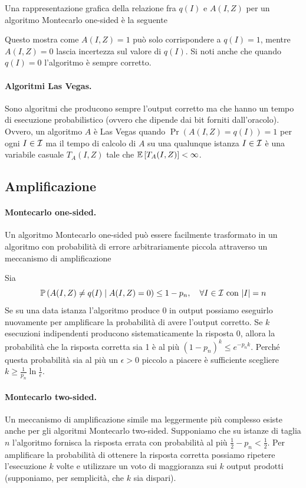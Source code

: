 Una rappresentazione grafica della relazione fra $q(I)$ e $A(I,Z)$ per un algoritmo Montecarlo one-sided è la seguente
\begin{center}
    
\end{center}

Questo mostra come $A(I,Z) = 1$ può solo corrispondere a $q(I) = 1$, mentre $A(I,Z) = 0$ lascia incertezza sul valore di $q(I)$. Si noti anche che quando $q(I) = 0$ l'algoritmo è sempre corretto.

\paragraph{Algoritmi Las Vegas.} Sono algoritmi che producono sempre l'output corretto ma che hanno un tempo di esecuzione probabilistico (ovvero che dipende dai bit forniti dall'oracolo). Ovvero, un algoritmo $A$ è Las Vegas quando $\Pr\left(A(I,Z) = q(I)\right) = 1$ per ogni $I \in \mathcal{I}$ ma il tempo di calcolo di $A$ su una qualunque istanza $I \in \mathcal{I}$ è una variabile casuale $T_A (I,Z)$ tale che $\mathbb{E}\left[T_A (I,Z)\right] < \infty$.

\subsection{Amplificazione}

\paragraph{Montecarlo one-sided.} Un algoritmo Montecarlo one-sided può essere facilmente trasformato in un algoritmo con probabilità di errore arbitrariamente piccola attraverso un meccanismo di amplificazione

Sia
$$ \mathbb{P} \left(A (I, Z) \neq q(I) \mid A(I, Z) = 0 \right) \leq 1 - p_n, \quad \forall I \in \mathcal{I} \text{ con } |I| = n $$
Se su una data istanza l'algoritmo produce 0 in output possiamo eseguirlo nuovamente per amplificare la probabilità di avere l'output corretto. Se $k$ esecuzioni indipendenti producono sistematicamente la risposta 0, allora la probabilità che la risposta corretta sia 1 è al più $\left(1 - p_n\right)^k \leq e^{-p_n k}$. Perché questa probabilità sia al più un $\epsilon > 0$ piccolo a piacere è sufficiente scegliere $k \geq \frac{1}{p_n} \ln \frac{1}{\epsilon}$.

\paragraph{Montecarlo two-sided.} Un meccanismo di amplificazione simile ma leggermente più complesso esiste anche per gli algoritmi Montecarlo two-sided. Supponiamo che su istanze di taglia $n$ l'algoritmo fornisca la risposta errata con probabilità al più $\frac{1}{2} - p_n < \frac{1}{2}$. Per amplificare la probabilità di ottenere la risposta corretta possiamo ripetere l'esecuzione $k$ volte e utilizzare un voto di maggioranza sui $k$ output prodotti (supponiamo, per semplicità, che $k$ sia dispari).

